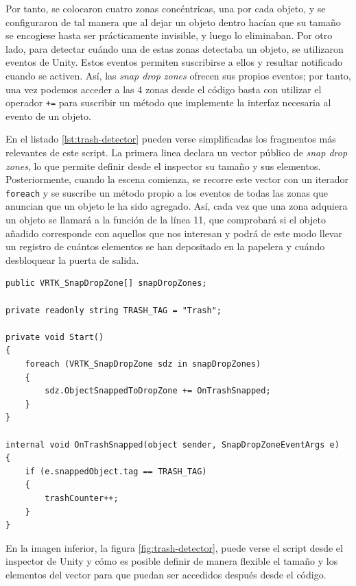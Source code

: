 Por tanto, se colocaron cuatro zonas concéntricas, una por cada objeto, y se configuraron de tal manera que al dejar un objeto dentro hacían que su tamaño se encogiese hasta ser prácticamente invisible, y luego lo eliminaban. Por otro lado, para detectar cuándo una de estas zonas detectaba un objeto, se utilizaron eventos de Unity. Estos eventos permiten suscribirse a ellos y resultar notificado cuando se activen. Así, las \textit{snap drop zones} ofrecen sus propios eventos; por tanto, una vez podemos acceder a las 4 zonas desde el código basta con utilizar el operador \texttt{+=} para suscribir un método que implemente la interfaz necesaria al evento de un objeto.

En el listado \ref{lst:trash-detector} pueden verse simplificadas los fragmentos más relevantes de este script. La primera linea declara un vector público de \textit{snap drop zones}, lo que permite definir desde el inspector su tamaño y sus elementos. Posteriormente, cuando la escena comienza, se recorre este vector con un iterador \texttt{foreach} y se suscribe un método propio a los eventos de todas las zonas que anuncian que un objeto le ha sido agregado. Así, cada vez que una zona adquiera un objeto se llamará a la función de la línea 11, que comprobará si el objeto añadido corresponde con aquellos que nos interesan y podrá de este modo llevar un registro de cuántos elementos se han depositado en la papelera y cuándo desbloquear la puerta de salida. 

\begin{lstlisting}[caption=Fragmento del script para detectar piezas de basura, label=lst:trash-detector]
public VRTK_SnapDropZone[] snapDropZones;

private readonly string TRASH_TAG = "Trash";

private void Start()
{
    foreach (VRTK_SnapDropZone sdz in snapDropZones)
    {
        sdz.ObjectSnappedToDropZone += OnTrashSnapped;
    }
}

internal void OnTrashSnapped(object sender, SnapDropZoneEventArgs e)
{
    if (e.snappedObject.tag == TRASH_TAG)
    {
        trashCounter++;
    }
}
\end{lstlisting}

En la imagen inferior, la figura \ref{fig:trash-detector}, puede verse el script desde el inspector de Unity y cómo es posible definir de manera flexible el tamaño y los elementos del vector para que puedan ser accedidos después desde el código. 

